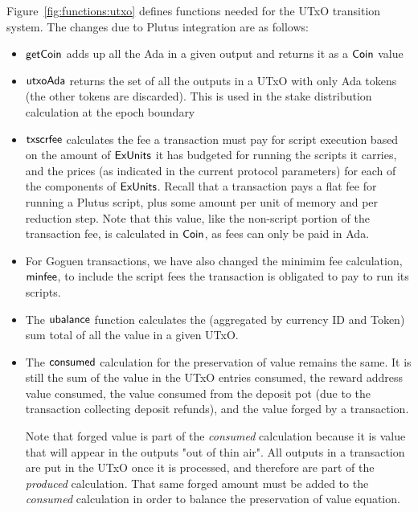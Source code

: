 Figure~\ref{fig:functions:utxo} defines functions needed for the UTxO transition system.
The changes due to Plutus integration are as follows:

\begin{itemize}

  \item $\mathsf{getCoin}$ adds up all the Ada in a given output and returns it as a
  $\mathsf{Coin}$ value

  \item $\mathsf{utxoAda}$ returns the set of all the outputs in a UTxO with only Ada
  tokens (the other tokens are discarded). This is used in the stake distribution
  calculation at the epoch boundary

  \item $\mathsf{txscrfee}$ calculates the fee a transaction must pay for script
  execution based on the amount of $\mathsf{ExUnits}$ it has budgeted for running the
  scripts it carries, and the prices (as indicated in the current protocol parameters)
  for each of the components of $\mathsf{ExUnits}$. Recall that a transaction pays a flat
  fee for running a Plutus script, plus some amount per unit of memory
  and per reduction step.
  Note that this value,
  like the non-script portion of the transaction fee, is calculated in $\mathsf{Coin}$,
  as fees can only be paid in Ada.

  \item For Goguen transactions, we have also changed the minimim fee calculation, $\mathsf{minfee}$,
  to include the script fees the transaction is obligated to pay to run its
  scripts.

  \item
    The $\mathsf{ubalance}$ function calculates the (aggregated by currency ID and
    Token) sum total of all the value in a given UTxO.

  \item The $\mathsf{consumed}$ calculation for the preservation of value remains the
  same. It is still the sum of the value in the UTxO entries consumed, the
   reward address value consumed, the
   value consumed from the deposit pot (due
   to the transaction collecting deposit refunds),
   and the value forged by a transaction.

   Note that forged value is part of the \textit{consumed} calculation because
   it is value that will appear in the outputs "out of thin air". All outputs
   in a transaction are put in the UTxO once it is processed, and therefore
   are part of the \textit{produced} calculation. That same forged amount must be
   added to the \textit{consumed} calculation in order to balance the preservation
   of value equation.


\end{itemize}
